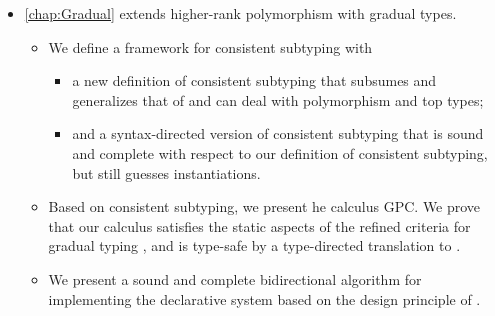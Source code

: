 \begin{itemize}
\item \cref{chap:Gradual} extends higher-rank
  polymorphism with gradual types.
  \begin{itemize}
  \item We define a framework for consistent subtyping with
    \begin{itemize}
    \item a new definition of
    consistent subtyping that subsumes and generalizes that of
    \cite{siek:consistent:subtyping} and can deal with polymorphism and top
    types;
    \item and a syntax-directed version of consistent subtyping that is sound
    and complete with respect to our definition of consistent subtyping, but
    still guesses instantiations.
    \end{itemize}
  \item Based on consistent subtyping, we present he calculus GPC. We prove that
    our calculus satisfies the static aspects of the refined criteria for
    gradual typing \citep{siek:criteria}, and is type-safe by a type-directed
    translation to \pbc \citep{amal:blame}.
  \item We present a sound and complete
    bidirectional algorithm for implementing the declarative system based on
    the design principle of \cite{garcia:principal}.
  \end{itemize}
  

\end{itemize}
